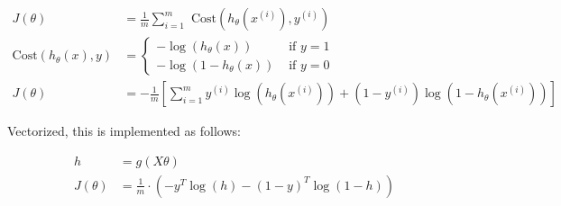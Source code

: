\documentclass{article}
\begin{document}
        \begin{align*}
            J(\theta)   &= \frac{1}{m}\sum^m_{i=1}\text{ Cost}(h_{\theta}(x^{(i)}),y^{(i)}) \\
            \text{Cost}(h_{\theta}(x),y) &=
            \begin{cases}
                -\log{(h_{\theta}(x))}   & \text{ if } y=1 \\
                -\log{(1-h_{\theta}(x))} & \text{ if } y=0
            \end{cases} \\
            J(\theta)   &= -\frac{1}{m}\left[
            \sum^m_{i=1}y^{(i)}\log({h_\theta (x^{(i)})}) + (1-y^{(i)})\log{(1-h_\theta (x^{(i)}))}
            \right]
        \end{align*}

        \noindent Vectorized, this is implemented as follows:

        \begin{align*}
            h   &= g(X\theta) \\
            J(\theta) &= \frac{1}{m}\cdot\left(-y^T \log{(h)}-(1-y)^T \log{(1-h)}\right)
        \end{align*}
\end{document}

